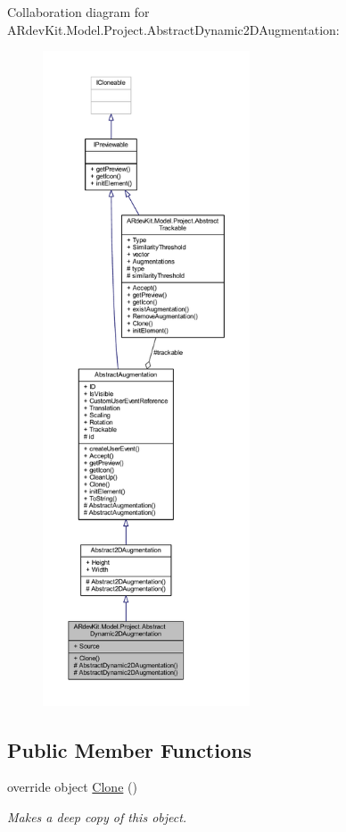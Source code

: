 Collaboration diagram for A\-Rdev\-Kit.\-Model.\-Project.\-Abstract\-Dynamic2\-D\-Augmentation\-:
\nopagebreak
\begin{figure}[H]
\begin{center}
\leavevmode
\includegraphics[height=550pt]{class_a_rdev_kit_1_1_model_1_1_project_1_1_abstract_dynamic2_d_augmentation__coll__graph}
\end{center}
\end{figure}
\subsection*{Public Member Functions}
\begin{DoxyCompactItemize}
\item 
override object \hyperlink{class_a_rdev_kit_1_1_model_1_1_project_1_1_abstract_dynamic2_d_augmentation_adbb2d06450362f0385fe937bbb5255a8}{Clone} ()
\begin{DoxyCompactList}\small\item\em Makes a deep copy of this object. \end{DoxyCompactList}\end{DoxyCompactItemize}
